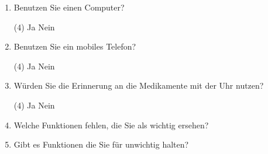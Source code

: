 \begin{enumerate}
\begin{tasks}(4)
\task Ja
\task Nein
\end{tasks}
\item Benutzen Sie einen Computer?
\begin{tasks}(4)
\task Ja
\task Nein
\end{tasks}
\item Benutzen Sie ein mobiles Telefon?
\begin{tasks}(4)
\task Ja
\task Nein
\end{tasks}
\item Würden Sie die Erinnerung an die Medikamente mit der Uhr nutzen?
\begin{tasks}(4)
\task Ja
\task Nein
\end{tasks}
\item Welche Funktionen fehlen, die Sie als wichtig ersehen?
\item Gibt es Funktionen die Sie für unwichtig halten?
\end{enumerate}
%



